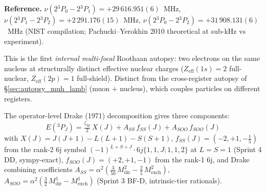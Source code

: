 \documentclass[11pt]{article}
\begin{document}
\textbf{Reference.}  $\nu(2{}^3P_0 - 2{}^3P_1) = +29\,616.951(6)$~MHz,
$\nu(2{}^3P_1 - 2{}^3P_2) = +2\,291.176(15)$~MHz,
$\nu(2{}^3P_0 - 2{}^3P_2) = +31\,908.131(6)$~MHz (NIST compilation;
Pachucki--Yerokhin 2010 theoretical at sub-kHz vs experiment).

This is the first \emph{internal multi-focal} Roothaan autopsy: two electrons
on the same nucleus at structurally distinct effective nuclear charges
($Z_\text{eff}(1s) = 2$ full-nuclear, $Z_\text{eff}(2p) = 1$ full-shield).
Distinct from the cross-register autopsy of \S\ref{sec:autopsy_muh_lamb}
(muon $+$ nucleus), which couples particles on different registers.

The operator-level Drake (1971) decomposition gives three components:
\begin{equation}
E({}^3P_J) = \tfrac{\zeta_{2p}}{2}\, X(J) + A_{SS}\, f_{SS}(J)
              + A_{SOO}\, f_{SOO}(J)
\end{equation}
with
$X(J) = J(J+1) - L(L+1) - S(S+1)$,
$f_{SS}(J) = (-2, +1, -\tfrac{1}{5})$ from the rank-2 6j symbol
$(-1)^{L+S+J}\cdot 6j\{1,1,J;1,1,2\}$ at $L = S = 1$ (Sprint 4 DD,
sympy-exact),
$f_{SOO}(J) = (+2, +1, -1)$ from the rank-1 6j,
and Drake combining coefficients
$A_{SS} = \alpha^2 (\tfrac{3}{50}\, M^2_\text{dir} - \tfrac{2}{5}\, M^2_\text{exch})$,
$A_{SOO} = \alpha^2 (\tfrac{3}{2}\, M^1_\text{dir} - M^1_\text{exch})$
(Sprint 3 BF-D, intrinsic-tier rationals).
\end{document}
